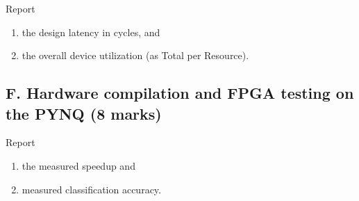 Report \begin{enumerate}
    \item the design latency in cycles, and
    \item the overall device utilization (as Total per Resource).
\end{enumerate}

\subsection{F. Hardware compilation and FPGA testing on the PYNQ (8 marks)}

Report
\begin{enumerate}
    \item the measured speedup and
    \item measured classification accuracy.
\end{enumerate}